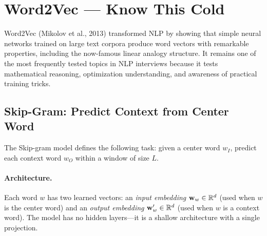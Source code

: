 \section{Word2Vec --- Know This Cold}
\label{sec:word2vec}

Word2Vec (Mikolov et al., 2013) transformed NLP by showing that simple neural
networks trained on large text corpora produce word vectors with remarkable
properties, including the now-famous linear analogy structure.  It remains one
of the most frequently tested topics in NLP interviews because it tests
mathematical reasoning, optimization understanding, and awareness of practical
training tricks.

\subsection{Skip-Gram: Predict Context from Center Word}

The Skip-gram model defines the following task: given a center word $w_I$,
predict each context word $w_O$ within a window of size $L$.

\paragraph{Architecture.}
Each word $w$ has two learned vectors: an \emph{input embedding}
$\mathbf{w}_w \in \mathbb{R}^d$ (used when $w$ is the center word) and an \emph{output
embedding} $\mathbf{w}'_w \in \mathbb{R}^d$ (used when $w$ is a context word).  The model
has no hidden layers---it is a shallow architecture with a single projection.

